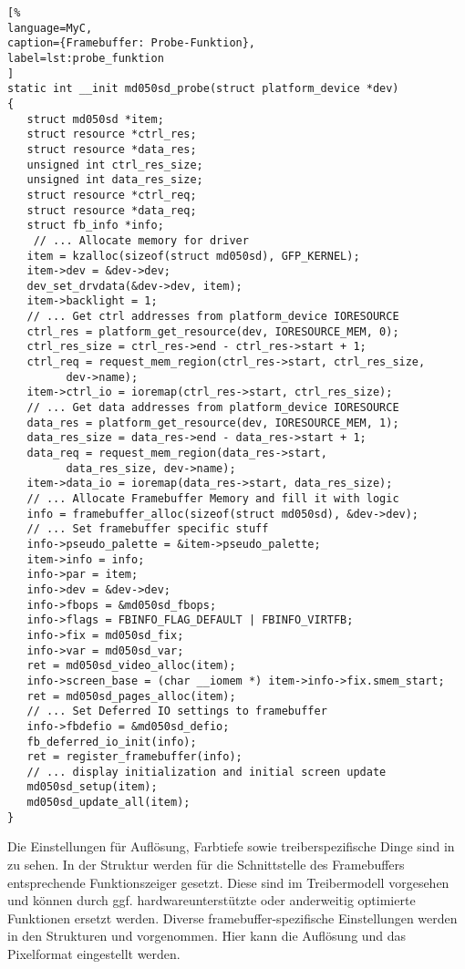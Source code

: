 \begin{lstlisting}[%
language=MyC,
caption={Framebuffer: Probe-Funktion},
label=lst:probe_funktion
]
static int __init md050sd_probe(struct platform_device *dev)
{
   struct md050sd *item;
   struct resource *ctrl_res;
   struct resource *data_res;
   unsigned int ctrl_res_size;
   unsigned int data_res_size;
   struct resource *ctrl_req;
   struct resource *data_req;
   struct fb_info *info;
	// ... Allocate memory for driver
   item = kzalloc(sizeof(struct md050sd), GFP_KERNEL);
   item->dev = &dev->dev;
   dev_set_drvdata(&dev->dev, item);
   item->backlight = 1;
   // ... Get ctrl addresses from platform_device IORESOURCE
   ctrl_res = platform_get_resource(dev, IORESOURCE_MEM, 0);
   ctrl_res_size = ctrl_res->end - ctrl_res->start + 1;
   ctrl_req = request_mem_region(ctrl_res->start, ctrl_res_size,
         dev->name);
   item->ctrl_io = ioremap(ctrl_res->start, ctrl_res_size);
   // ... Get data addresses from platform_device IORESOURCE
   data_res = platform_get_resource(dev, IORESOURCE_MEM, 1);
   data_res_size = data_res->end - data_res->start + 1;
   data_req = request_mem_region(data_res->start,
         data_res_size, dev->name);
   item->data_io = ioremap(data_res->start, data_res_size);
   // ... Allocate Framebuffer Memory and fill it with logic
   info = framebuffer_alloc(sizeof(struct md050sd), &dev->dev);
   // ... Set framebuffer specific stuff
   info->pseudo_palette = &item->pseudo_palette;
   item->info = info;
   info->par = item;
   info->dev = &dev->dev;
   info->fbops = &md050sd_fbops;
   info->flags = FBINFO_FLAG_DEFAULT | FBINFO_VIRTFB;
   info->fix = md050sd_fix;
   info->var = md050sd_var;
   ret = md050sd_video_alloc(item);
   info->screen_base = (char __iomem *) item->info->fix.smem_start;
   ret = md050sd_pages_alloc(item);
   // ... Set Deferred IO settings to framebuffer
   info->fbdefio = &md050sd_defio;
   fb_deferred_io_init(info);
   ret = register_framebuffer(info);
   // ... display initialization and initial screen update
   md050sd_setup(item);
   md050sd_update_all(item);
}
\end{lstlisting}
Die Einstellungen für Auflösung, Farbtiefe sowie treiberspezifische Dinge sind in  zu sehen.  In der Struktur  werden für die Schnittstelle des Framebuffers entsprechende Funktionszeiger gesetzt. Diese sind im Treibermodell vorgesehen und können durch ggf. hardwareunterstützte oder anderweitig optimierte Funktionen ersetzt werden. Diverse framebuffer-spezifische Einstellungen werden in den Strukturen  und  vorgenommen. Hier kann die Auflösung und das Pixelformat eingestellt werden. 


